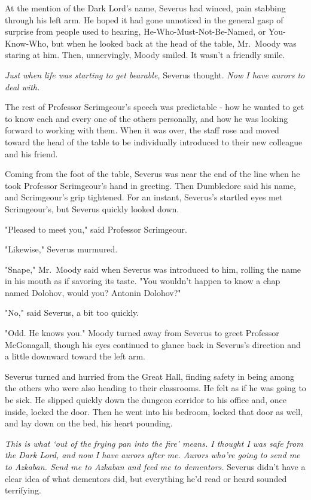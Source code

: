At the mention of the Dark Lord's name, Severus had winced, pain stabbing through his left arm. He hoped it had gone unnoticed in the general gasp of surprise from people used to hearing, He-Who-Must-Not-Be-Named, or You-Know-Who, but when he looked back at the head of the table, Mr.~Moody was staring at him. Then, unnervingly, Moody smiled. It wasn't a friendly smile.

\emph{Just when life was starting to get bearable,} Severus thought. \emph{Now I have aurors to deal with.}

The rest of Professor Scrimgeour's speech was predictable - how he wanted to get to know each and every one of the others personally, and how he was looking forward to working with them. When it was over, the staff rose and moved toward the head of the table to be individually introduced to their new colleague and his friend.

Coming from the foot of the table, Severus was near the end of the line when he took Professor Scrimgeour's hand in greeting. Then Dumbledore said his name, and Scrimgeour's grip tightened. For an instant, Severus's startled eyes met Scrimgeour's, but Severus quickly looked down.

"Pleased to meet you," said Professor Scrimgeour.

"Likewise," Severus murmured.

"Snape," Mr.~Moody said when Severus was introduced to him, rolling the name in his mouth as if savoring its taste. "You wouldn't happen to know a chap named Dolohov, would you? Antonin Dolohov?"

"No," said Severus, a bit too quickly.

"Odd. He knows you." Moody turned away from Severus to greet Professor McGonagall, though his eyes continued to glance back in Severus's direction and a little downward toward the left arm.

Severus turned and hurried from the Great Hall, finding safety in being among the others who were also heading to their classrooms. He felt as if he was going to be sick. He slipped quickly down the dungeon corridor to his office and, once inside, locked the door. Then he went into his bedroom, locked that door as well, and lay down on the bed, his heart pounding.

\emph{This is what `out of the frying pan into the fire' means. I thought I was safe from the Dark Lord, and now I have aurors after me. Aurors who're going to send me to Azkaban. Send me to Azkaban and feed me to dementors.} Severus didn't have a clear idea of what dementors did, but everything he'd read or heard sounded terrifying.

